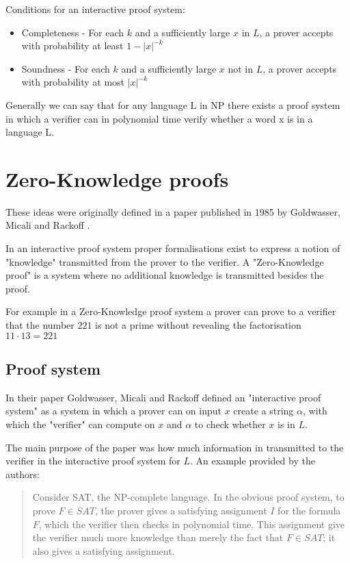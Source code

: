 \documentclass[12pt,a4paper]{article}
\begin{document}
Conditions for an interactive proof system:
\begin{itemize}
  \item Completeness - For each $k$ and a sufficiently large $x$ in $L$, a prover accepts with probability at least $1 - |x|^{-k}$ 
  \item Soundness - For each $k$ and a sufficiently large $x$ not in $L$, a prover accepts with   probability at most $|x|^{-k}$
\end{itemize}
Generally we can say that for any language L in NP there exists a proof system in which a verifier can in polynomial time verify whether a word x is in a language L.

\section{Zero-Knowledge proofs}
These ideas were originally defined in a paper published in 1985 by Goldwasser, Micali and Rackoff \cite{10.1145/22145.22178}. 

In an interactive proof system proper formalisations exist to express a notion of "knowledge" transmitted from the prover to the verifier. A "Zero-Knowledge proof" is a system where no additional knowledge is transmitted besides the proof.

For example in a Zero-Knowledge proof system a prover can prove to a verifier that the number $221$ is not a prime without revealing the factorisation $11 \cdot 13 = 221$ 

\subsection{Proof system}
In their paper \cite{10.1145/22145.22178} Goldwasser, Micali and Rackoff defined an "interactive proof system" as a system in which a prover can on input $x$ create a string $\alpha$, with which the "verifier" can compute on $x$ and $\alpha$ to check whether $x$ is in $L$.

The main purpose of the paper was how much information in transmitted to the verifier in the interactive proof system for $L$.
An example provided by the authors:
\begin{quotation}
Consider SAT, the NP-complete language. In the obvious proof system, to prove $F \in SAT$, the prover gives a satisfying assignment $I$ for the formula $F$, which the verifier then checks in polynomial time. This assignment give the verifier much more knowledge than merely the fact that $F \in SAT$; it also gives a satisfying assignment.
\end{quotation}
\end{document}
